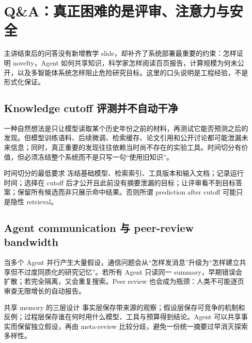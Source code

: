 \documentclass[a4paper]{article}
\begin{document}
\section{Q\&A：真正困难的是评审、注意力与安全}

主讲结束后的问答没有新增教学 slide，却补齐了系统部署最重要的约束：怎样证明 novelty，Agent 如何共享知识，科学家怎样阅读百页报告，计算规模为何未公开，以及多智能体系统怎样阻止危险研究目标。这里的口头说明是工程经验，不是形式化保证。

\subsection{Knowledge cutoff 评测并不自动干净}

一种自然想法是只让模型读取某个历史年份之前的材料，再测试它能否预测之后的发现。但模型训练语料、后续微调、检索缓存、论文引用和公开讨论都可能泄漏未来信息；同时，真正重要的发现往往依赖当时尚不存在的实验工具。时间切分有价值，但必须冻结整个系统而不是只写一句“使用旧知识”。

\begin{warningbox}{时间切分的最低要求}
冻结基础模型、检索索引、工具版本和输入文档；记录运行时间；选择在 cutoff 后才公开且此前没有摘要泄漏的目标；让评审看不到目标答案；保留所有候选而非只展示命中结果。否则所谓 prediction after cutoff 可能只是隐性 retrieval。
\end{warningbox}


\subsection{Agent communication 与 peer-review bandwidth}

当多个 Agent 并行产生大量假设，通信问题会从“怎样发消息”升级为“怎样建立共享但不过度同质化的研究记忆”。若所有 Agent 只读同一 summary，早期错误会扩散；若完全隔离，又会重复搜索。Peer review 也会成为瓶颈：人类不可能逐页审查无限增长的自动报告。

\begin{knowledgebox}{共享 memory 的三层设计}
事实层保存带来源的观察；假设层保存可竞争的机制和反例；过程层保存谁在何时用什么模型、工具与预算得到结论。Agent 可以共享事实而保留独立假设，再由 meta-review 比较分歧，避免一份统一摘要过早消灭探索多样性。
\end{knowledgebox}

\end{document}
